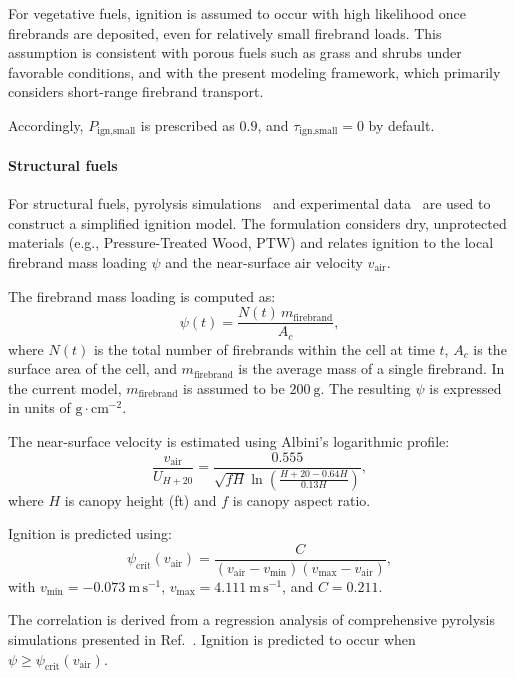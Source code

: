 For vegetative fuels, ignition is assumed to occur with high likelihood once firebrands are deposited, even for relatively small firebrand loads. This assumption is consistent with porous fuels such as grass and shrubs under favorable conditions, and with the present modeling framework, which primarily considers short-range firebrand transport.

Accordingly, $P_{\text{ign,small}}$ is prescribed as $0.9$, and $\tau_{\text{ign,small}} = 0$ by default.

\paragraph{Structural fuels}

For structural fuels, pyrolysis simulations~\cite{qinPhysicsBasedEulerianFramework2025} and experimental data~\cite{debeerEmpiricalFirebrandPile2023} are used to construct a simplified ignition model. The formulation considers dry, unprotected materials (e.g., Pressure-Treated Wood, PTW) and relates ignition to the local firebrand mass loading $\psi$ and the near-surface air velocity $v_{\text{air}}$.

The firebrand mass loading is computed as:
\[
\psi(t) = \frac{N(t)\, m_{\text{firebrand}}}{A_c},
\]
where $N(t)$ is the total number of firebrands within the cell at time $t$, $A_c$ is the surface area of the cell, and $m_{\text{firebrand}}$ is the average mass of a single firebrand. In the current model, $m_{\text{firebrand}}$ is assumed to be $200~\mathrm{g}$. The resulting $\psi$ is expressed in units of $\mathrm{g\cdot cm^{-2}}$.

The near-surface velocity is estimated using Albini’s logarithmic profile:
\begin{equation}\label{eq:wind_correction_albini}
\frac{v_{\text{air}}}{U_{H+20}} =
\frac{0.555}{\sqrt{fH}\ln\left(\frac{H+20-0.64H}{0.13H}\right)},
\end{equation}
where $H$ is canopy height (ft) and $f$ is canopy aspect ratio.

Ignition is predicted using:
\begin{equation}
\psi_{\text{crit}}(v_{\text{air}}) = \frac{C}{(v_{\text{air}} - v_{\min})(v_{\max} - v_{\text{air}})},
\end{equation}
with $v_{\min} = -0.073~\mathrm{m\,s^{-1}}$, $v_{\max} = 4.111~\mathrm{m\,s^{-1}}$, and $C = 0.211$.

The correlation is derived from a regression analysis of comprehensive pyrolysis simulations presented in Ref.~\cite{qinPhysicsBasedEulerianFramework2025}. Ignition is predicted to occur when $\psi \ge \psi_{\text{crit}}(v_{\text{air}})$.

